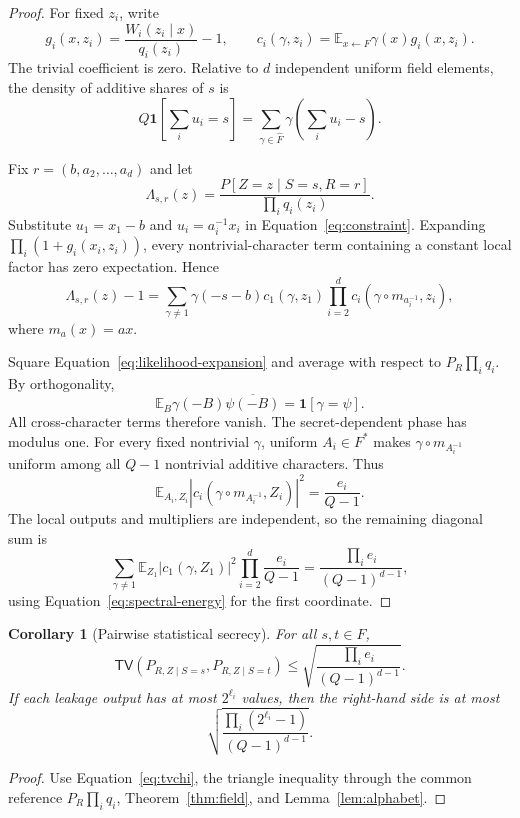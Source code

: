 \documentclass[11pt]{article}
\newtheorem{corollary}[theorem]{Corollary}
\theoremstyle{definition}
\newcommand{\E}{\mathbb{E}}
\newcommand{\TV}{\mathsf{TV}}
\begin{document}
\begin{proof}
For fixed $z_i$, write
\[
 g_i(x,z_i)=\frac{W_i(z_i\mid x)}{q_i(z_i)}-1,
 \qquad
 c_i(\gamma,z_i)=\E_{x\leftarrow F}\gamma(x)g_i(x,z_i).
\]
The trivial coefficient is zero.  Relative to $d$ independent uniform field
elements, the density of additive shares of $s$ is
\begin{equation}\label{eq:constraint}
 Q\mathbf 1\left[\sum_i u_i=s\right]
 =\sum_{\gamma\in\widehat F}\gamma\left(\sum_i u_i-s\right).
\end{equation}

Fix $r=(b,a_2,\ldots,a_d)$ and let
\[
 \Lambda_{s,r}(z)=
 \frac{P[Z=z\mid S=s,R=r]}{\prod_i q_i(z_i)}.
\]
Substitute $u_1=x_1-b$ and $u_i=a_i^{-1}x_i$ in
Equation~\eqref{eq:constraint}.  Expanding
$\prod_i(1+g_i(x_i,z_i))$, every nontrivial-character term containing a
constant local factor has zero expectation.  Hence
\begin{equation}\label{eq:likelihood-expansion}
 \Lambda_{s,r}(z)-1
 =\sum_{\gamma\neq1}
   \gamma(-s-b)c_1(\gamma,z_1)
   \prod_{i=2}^{d}c_i(\gamma\circ m_{a_i^{-1}},z_i),
\end{equation}
where $m_a(x)=ax$.

Square Equation~\eqref{eq:likelihood-expansion} and average with respect to
$P_R\prod_iq_i$.  By orthogonality,
\[
 \E_B\gamma(-B)\overline{\psi(-B)}=\mathbf1[\gamma=\psi].
\]
All cross-character terms therefore vanish.  The secret-dependent phase has
modulus one.  For every fixed nontrivial $\gamma$, uniform $A_i\in F^{*}$
makes $\gamma\circ m_{A_i^{-1}}$ uniform among all $Q-1$ nontrivial additive
characters.  Thus
\[
 \E_{A_i,Z_i}
   |c_i(\gamma\circ m_{A_i^{-1}},Z_i)|^2
 =\frac{e_i}{Q-1}.
\]
The local outputs and multipliers are independent, so the remaining diagonal
sum is
\[
 \sum_{\gamma\neq1}
   \E_{Z_1}|c_1(\gamma,Z_1)|^2
   \prod_{i=2}^{d}\frac{e_i}{Q-1}
 =\frac{\prod_i e_i}{(Q-1)^{d-1}},
\]
using Equation~\eqref{eq:spectral-energy} for the first coordinate.
\end{proof}

\begin{corollary}[Pairwise statistical secrecy]\label{cor:tv}
For all $s,t\in F$,
\[
 \TV(P_{R,Z\mid S=s},P_{R,Z\mid S=t})
 \leq
 \sqrt{\frac{\prod_i e_i}{(Q-1)^{d-1}}}.
\]
If each leakage output has at most $2^{\ell_i}$ values, then the right-hand side
is at most
\[
 \sqrt{\frac{\prod_i(2^{\ell_i}-1)}{(Q-1)^{d-1}}}.
\]
\end{corollary}

\begin{proof}
Use Equation~\eqref{eq:tvchi}, the triangle inequality through the common
reference $P_R\prod_iq_i$, Theorem~\ref{thm:field}, and
Lemma~\ref{lem:alphabet}.
\end{proof}
\end{document}

